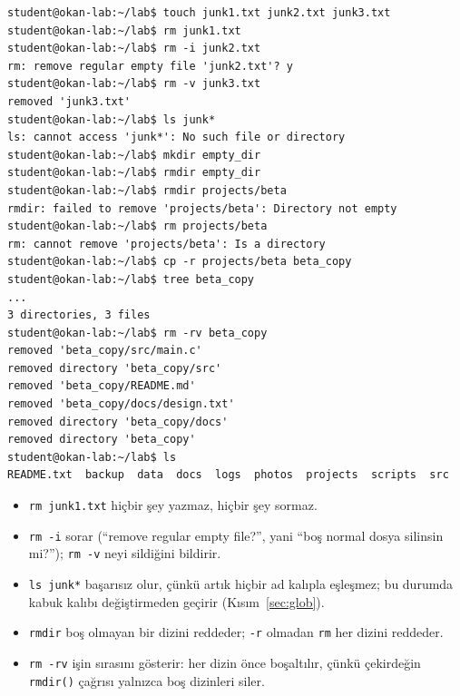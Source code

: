 \documentclass[11pt,a4paper]{article}
\newcommand{\cmd}[1]{\texttt{#1}}
\begin{document}
\begin{lstlisting}[style=term]
student@okan-lab:~/lab$ touch junk1.txt junk2.txt junk3.txt
student@okan-lab:~/lab$ rm junk1.txt
student@okan-lab:~/lab$ rm -i junk2.txt
rm: remove regular empty file 'junk2.txt'? y
student@okan-lab:~/lab$ rm -v junk3.txt
removed 'junk3.txt'
student@okan-lab:~/lab$ ls junk*
ls: cannot access 'junk*': No such file or directory
student@okan-lab:~/lab$ mkdir empty_dir
student@okan-lab:~/lab$ rmdir empty_dir
student@okan-lab:~/lab$ rmdir projects/beta
rmdir: failed to remove 'projects/beta': Directory not empty
student@okan-lab:~/lab$ rm projects/beta
rm: cannot remove 'projects/beta': Is a directory
student@okan-lab:~/lab$ cp -r projects/beta beta_copy
student@okan-lab:~/lab$ tree beta_copy
...
3 directories, 3 files
student@okan-lab:~/lab$ rm -rv beta_copy
removed 'beta_copy/src/main.c'
removed directory 'beta_copy/src'
removed 'beta_copy/README.md'
removed 'beta_copy/docs/design.txt'
removed directory 'beta_copy/docs'
removed directory 'beta_copy'
student@okan-lab:~/lab$ ls
README.txt  backup  data  docs  logs  photos  projects  scripts  src
\end{lstlisting}

\begin{itemize}
  \item \cmd{rm junk1.txt} hiçbir şey yazmaz, hiçbir şey sormaz.
  \item \cmd{rm -i} sorar (``remove regular empty file?'', yani ``boş normal dosya silinsin mi?''); \cmd{rm -v} neyi sildiğini bildirir.
  \item \cmd{ls junk*} başarısız olur, çünkü artık hiçbir ad kalıpla eşleşmez; bu durumda kabuk kalıbı değiştirmeden geçirir (Kısım~\ref{sec:glob}).
  \item \cmd{rmdir} boş olmayan bir dizini reddeder; \cmd{-r} olmadan \cmd{rm} her dizini reddeder.
  \item \cmd{rm -rv} işin sırasını gösterir: her dizin önce boşaltılır, çünkü çekirdeğin \cmd{rmdir()} çağrısı yalnızca boş dizinleri siler.
\end{itemize}
\end{document}
